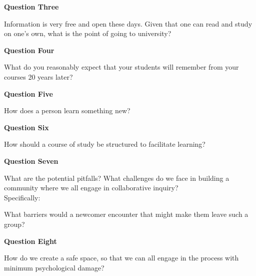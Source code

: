 \documentclass[10pt,handout]{beamer}
\begin{document}
\begin{frame}{\textbf{Question Three}}

\begin{center}{\Huge Information is very free and open these days. Given that one can read and study on one's own, what is the point of going to university?}\end{center}

\end{frame}


\begin{frame}{\textbf{Question Four}}

\begin{center}{\Huge What do you reasonably expect that your students will remember from your courses 20 years later?}\end{center}

\end{frame}

\begin{frame}{\textbf{Question Five}}

\begin{center}{\Huge How does a person learn something new?}\end{center}

\end{frame}

\begin{frame}{\textbf{Question Six}}

\begin{center}{\Huge How should a course of study be structured to facilitate learning?}\end{center}

\end{frame}

\begin{frame}{\textbf{Question Seven}}

{\Large
What are the potential pitfalls? What challenges do we face in building a community where we all engage in collaborative inquiry?}\\[.5in]

Specifically:
\begin{center}{\huge What barriers would a newcomer encounter that might make them leave such a group?}\end{center}

\end{frame}

\begin{frame}{\textbf{Question Eight}}

\begin{center}{\Huge How do we create a safe space, so that we can all engage in the process with minimum psychological damage?}\end{center}

\end{frame}

\end{document}
